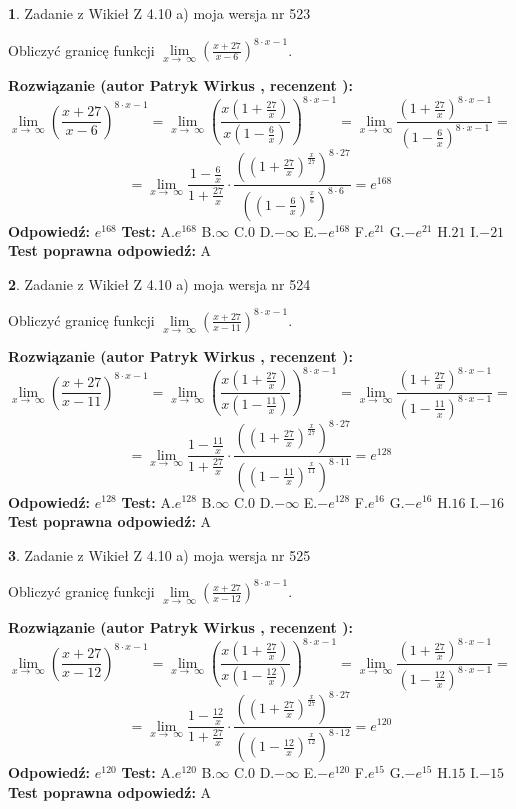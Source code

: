 \documentclass[12pt, a4paper]{article}
\theoremstyle{definition} %
\newtheorem{zad}{}
\newcommand{\zadStart}[1]{\begin{zad}#1\newline}
\newcommand{\zadStop}{\end{zad}}
\newcommand{\rozwStart}[2]{\noindent \textbf{Rozwiązanie (autor #1 , recenzent #2): }\newline}
\newcommand{\rozwStop}{\newline}
\newcommand{\odpStart}{\noindent \textbf{Odpowiedź:}\newline}
\newcommand{\odpStop}{\newline}
\newcommand{\testStart}{\noindent \textbf{Test:}\newline}
\newcommand{\testStop}{\newline}
\newcommand{\kluczStart}{\noindent \textbf{Test poprawna odpowiedź:}\newline}
\newcommand{\kluczStop}{\newline}
\begin{document}
\zadStart{Zadanie z Wikieł Z 4.10 a) moja wersja nr 523}

Obliczyć granicę funkcji  $\lim\limits_{x\to\ \infty}(\frac{x+27}{x-6})^{8\cdot x-1}$.
\zadStop
\rozwStart{Patryk Wirkus}{}
$$\lim\limits_{x\to\ \infty}(\frac{x+27}{x-6})^{8\cdot x-1} = \lim\limits_{x\to\ \infty}(\frac{x(1+\frac{27}{x})}{x(1-\frac{6}{x})})^{8\cdot x-1}=\lim\limits_{x\to\ \infty}\frac{(1+\frac{27}{x})^{8\cdot x-1}}{(1-\frac{6}{x})^{8\cdot x-1}}=$$
$$=\lim\limits_{x\to\ \infty}\frac{1-\frac{6}{x}}{1+\frac{27}{x}}\cdot\frac{((1+\frac{27}{x})^{\frac{x}{27}})^{8\cdot27}}{((1-\frac{6}{x})^{\frac{x}{6}})^{8\cdot6}}=e^{168}$$
\rozwStop
\odpStart
$e^{168}$
\odpStop
\testStart
A.$e^{168}$ B.$\infty$ C.$0$ D.$-\infty$ E.$-e^{168}$
F.$e^{21}$ G.$-e^{21}$
H.$21$
I.$-21$
\testStop
\kluczStart
A
\kluczStop



\zadStart{Zadanie z Wikieł Z 4.10 a) moja wersja nr 524}

Obliczyć granicę funkcji  $\lim\limits_{x\to\ \infty}(\frac{x+27}{x-11})^{8\cdot x-1}$.
\zadStop
\rozwStart{Patryk Wirkus}{}
$$\lim\limits_{x\to\ \infty}(\frac{x+27}{x-11})^{8\cdot x-1} = \lim\limits_{x\to\ \infty}(\frac{x(1+\frac{27}{x})}{x(1-\frac{11}{x})})^{8\cdot x-1}=\lim\limits_{x\to\ \infty}\frac{(1+\frac{27}{x})^{8\cdot x-1}}{(1-\frac{11}{x})^{8\cdot x-1}}=$$
$$=\lim\limits_{x\to\ \infty}\frac{1-\frac{11}{x}}{1+\frac{27}{x}}\cdot\frac{((1+\frac{27}{x})^{\frac{x}{27}})^{8\cdot27}}{((1-\frac{11}{x})^{\frac{x}{11}})^{8\cdot11}}=e^{128}$$
\rozwStop
\odpStart
$e^{128}$
\odpStop
\testStart
A.$e^{128}$ B.$\infty$ C.$0$ D.$-\infty$ E.$-e^{128}$
F.$e^{16}$ G.$-e^{16}$
H.$16$
I.$-16$
\testStop
\kluczStart
A
\kluczStop



\zadStart{Zadanie z Wikieł Z 4.10 a) moja wersja nr 525}

Obliczyć granicę funkcji  $\lim\limits_{x\to\ \infty}(\frac{x+27}{x-12})^{8\cdot x-1}$.
\zadStop
\rozwStart{Patryk Wirkus}{}
$$\lim\limits_{x\to\ \infty}(\frac{x+27}{x-12})^{8\cdot x-1} = \lim\limits_{x\to\ \infty}(\frac{x(1+\frac{27}{x})}{x(1-\frac{12}{x})})^{8\cdot x-1}=\lim\limits_{x\to\ \infty}\frac{(1+\frac{27}{x})^{8\cdot x-1}}{(1-\frac{12}{x})^{8\cdot x-1}}=$$
$$=\lim\limits_{x\to\ \infty}\frac{1-\frac{12}{x}}{1+\frac{27}{x}}\cdot\frac{((1+\frac{27}{x})^{\frac{x}{27}})^{8\cdot27}}{((1-\frac{12}{x})^{\frac{x}{12}})^{8\cdot12}}=e^{120}$$
\rozwStop
\odpStart
$e^{120}$
\odpStop
\testStart
A.$e^{120}$ B.$\infty$ C.$0$ D.$-\infty$ E.$-e^{120}$
F.$e^{15}$ G.$-e^{15}$
H.$15$
I.$-15$
\testStop
\kluczStart
A
\kluczStop
\end{document}
